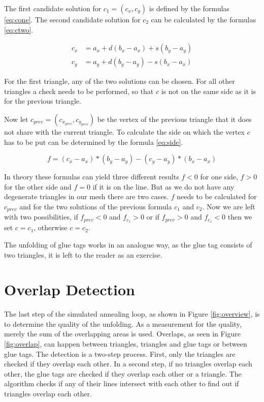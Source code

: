 \documentclass[draft,final]{vutinfth} %
\begin{document}
The first candidate solution for $c_1 = (c_x, c_y)$ is defined by the formulas \ref{eq:cone}. The second candidate solution for $c_2$ can be calculated by the formulas \ref{eq:ctwo}. 

\begin{equation}
\label{eq:ctwo}
\begin{split}
c_x &= a_x + d(b_x - a_x) + s(b_y - a_y)\\
c_y &= a_y + d(b_y - a_y) - s(b_x - a_x)
\end{split}
\end{equation}

For the first triangle, any of the two solutions can be chosen. For all other triangles a check needs to be performed, so that $c$ is not on the same side as it is for the previous triangle.


Now let $c_{prev} = (c_{x_{prev}},c_{y_{prev}})$ be the vertex of the previous triangle that it does not share with the current triangle. To calculate the side on which the vertex $c$ has to be put can be determined by the formula \ref{eq:side}.

\begin{equation}
\label{eq:side}
f = (c_x - a_x) * (b_y - a_y) - (c_y - a_y) * (b_x - a_x)
\end{equation}

In theory these formulas can yield three different results $f < 0$ for one side, $f > 0$ for the other side and $f = 0$ if it is on the line. But as we do not have any degenerate triangles in our mesh there are two cases. $f$ needs to be calculated for $c_{prev}$ and for the two solutions of the previous formula $c_1$ and $c_2$. Now we are left with two possibilities, if $f_{prev} < 0$ and $f_{c_1} > 0$ or if $f_{prev} > 0$ and $f_{c_1} < 0$ then we set $c = c_1$, otherwise $c = c_2$.

The unfolding of glue tags works in an analogue way, as the glue tag consists of two triangles, it is left to the reader as an exercise.

\section{Overlap Detection}

The last step of the simulated annealing loop, as shown in Figure \ref{fig:overview}, is to determine the quality of the unfolding. As a measurement for the quality, merely the sum of the overlapping areas is used. Overlaps, as seen in Figure \ref{fig:overlap}, can happen between triangles, triangles and glue tags or between glue tags. The detection is a two-step process. First, only the triangles are checked if they overlap each other. In a second step, if no triangles overlap each other, the glue tags are checked if they overlap each other or a triangle. The algorithm checks if any of their lines intersect with each other to find out if triangles overlap each other.
\end{document}
